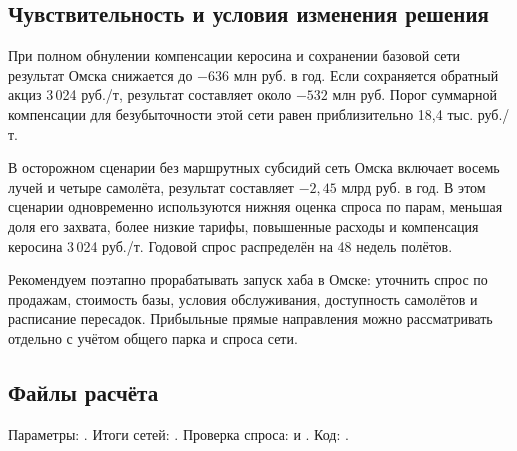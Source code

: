 \documentclass[11pt,a4paper]{article}
\begin{document}
\subsection*{Чувствительность и условия изменения решения}

При полном обнулении компенсации керосина и сохранении базовой сети
результат Омска снижается до $-636$ млн руб. в год.
Если сохраняется обратный акциз 3\,024 руб./т, результат составляет
около $-532$ млн руб. Порог суммарной компенсации для безубыточности
этой сети равен приблизительно 18,4 тыс. руб./т.

В осторожном сценарии без маршрутных субсидий сеть Омска включает
восемь лучей и четыре самолёта, результат составляет
$-2{,}45$ млрд руб. в год. В этом сценарии одновременно используются
нижняя оценка спроса по парам, меньшая доля его захвата, более низкие
тарифы, повышенные расходы и компенсация керосина 3\,024 руб./т.
Годовой спрос распределён на 48 недель полётов.

Рекомендуем поэтапно прорабатывать запуск хаба в Омске:
уточнить спрос по продажам, стоимость базы, условия обслуживания,
доступность самолётов и расписание пересадок. Прибыльные прямые
направления можно рассматривать отдельно с учётом общего парка
и спроса сети.

\subsection*{Файлы расчёта}

Параметры: .
Итоги сетей: .
Проверка спроса: 
и .
Код: .
\end{document}
